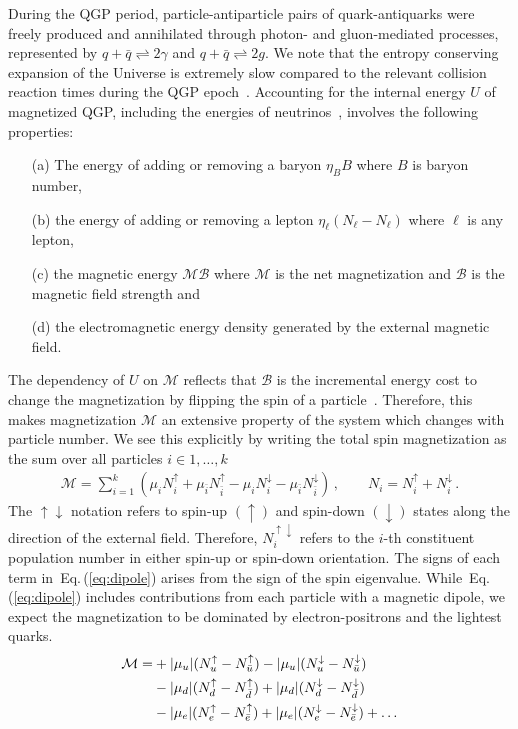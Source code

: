 \documentclass[epjST]{svjour}
\newcommand{\req}[1]{Eq.\,(\ref{#1})}
\begin{document}
During the QGP period, particle-antiparticle pairs of quark-antiquarks were freely produced and annihilated through photon- and gluon-mediated processes, represented by \(q+\bar{q}\rightleftharpoons2\gamma\) and \(q+\bar{q}\rightleftharpoons2g\). We note that the entropy conserving expansion of the Universe is extremely slow compared to the relevant collision reaction times during the QGP epoch~\cite{Yang:2024ret}. Accounting for the internal energy $U$ of magnetized QGP, including the energies of neutrinos~\cite{Birrell:2014ona}, involves the following properties: 
\begin{itemize}
\item[(a)] The energy of adding or removing a baryon $\eta_{B}B$ where \(B\) is baryon number,
\item[(b)] the energy of adding or removing a lepton $\eta_{\ell}(N_{\ell}-N_{\ell})$ where $\ell$ is any lepton, 
\item[(c)] the magnetic energy $\mathcal{M}\mathcal{B}$ where $\mathcal{M}$ is the net magnetization and $\mathcal{B}$ is the magnetic field strength and
\item[(d)] the electromagnetic energy density generated by the external magnetic field.
\end{itemize}

The dependency of $U$ on $\mathcal{M}$ reflects that $\mathcal{B}$ is the incremental energy cost to change the magnetization by flipping the spin of a particle~\cite{Bali:2014kia}. Therefore, this makes magnetization $\mathcal{M}$ an extensive property of the system which changes with particle number. We see this explicitly by writing the total spin magnetization as the sum over all particles $i\in{1,\ldots,k}$
\begin{align}
\label{eq:dipole}
\mathcal{M} = \sum_{i=1}^{k}(\mu_{i}N_{i}^{\uparrow} + \mu_{\bar{i}}N_{\bar{i}}^{\uparrow} - \mu_{i}N_{i}^{\downarrow} - \mu_{\bar{i}}N_{\bar{i}}^{\downarrow})\,,\qquad
N_{i} = N_{i}^{\uparrow} + N_{i}^{\downarrow}\,.
\end{align}
The $\uparrow\downarrow$ notation refers to spin-up $(\uparrow)$ and spin-down $(\downarrow)$ states along the direction of the external field. Therefore, $N_{i}^{\uparrow\downarrow}$ refers to the $i$-th constituent population number in either spin-up or spin-down orientation. The signs of each term in~\req{eq:dipole} arises from the sign of the spin eigenvalue. While~\req{eq:dipole} includes contributions from each particle with a magnetic dipole, we expect the magnetization to be dominated by electron-positrons and the lightest quarks.
\begin{align}
\notag\mathcal{M} = &+|\mu_{u}|(N_{u}^{\uparrow}-N_{\bar{u}}^{\uparrow})-|\mu_{u}|(N_{u}^{\downarrow}-N_{\bar{u}}^{\downarrow})\\
\notag &-|\mu_{d}|(N_{d}^{\uparrow}-N_{\bar{d}}^{\uparrow})+|\mu_{d}|(N_{d}^{\downarrow}-N_{\bar{d}}^{\downarrow})\\
\label{eq:dipole2}
&-|\mu_{e}|(N_{e}^{\uparrow}-N_{\bar{e}}^{\uparrow})+|\mu_{e}|(N_{e}^{\downarrow}-N_{\bar{e}}^{\downarrow})+\ldots
\end{align}
\end{document}
